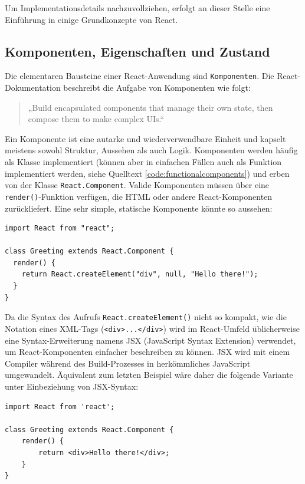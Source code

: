 Um Implementationsdetails nachzuvollziehen, erfolgt an dieser Stelle eine Einführung in einige Grundkonzepte von React.

\subsection{Komponenten, Eigenschaften und Zustand}
Die elementaren Bausteine einer React-Anwendung sind \texttt{Komponenten}. Die React-Dokumentation beschreibt die Aufgabe von Komponenten wie folgt\cite[Header-Sektion]{web:react}:
\begin{quote}
„Build encapsulated components that manage their own state, then compose them to make complex UIs.“
\end{quote}

Ein Komponente ist eine autarke und wiederverwendbare Einheit und kapselt meistens sowohl Struktur, Aussehen als auch Logik. Komponenten werden häufig als Klasse implementiert (können aber in einfachen Fällen auch als Funktion implementiert werden, siehe Quelltext \ref{code:functionalcomponents}) und erben von der Klasse \texttt{React.Component}. Valide Komponenten müssen über eine \texttt{render()}-Funktion verfügen, die HTML oder andere React-Komponenten zurückliefert. Eine sehr simple, statische Komponente könnte so aussehen:

\begin{minipage}{\linewidth}
\begin{lstlisting}[caption={Einfache React-Komponente ohne JSX-Syntax.}]
import React from "react";

class Greeting extends React.Component {
  render() {
    return React.createElement("div", null, "Hello there!");
  }
}
\end{lstlisting}
\end{minipage}

Da die Syntax des Aufrufs \texttt{React.createElement()} nicht so kompakt, wie die Notation eines XML-Tags (\texttt{<div>...</div>}) wird im React-Umfeld üblicherweise eine Syntax-Erweiterung namens JSX (JavaScript Syntax Extension) verwendet, um React-Komponenten einfacher beschreiben zu können. JSX wird mit einem Compiler während des Build-Prozesses in herkömmliches JavaScript umgewandelt. Äquivalent zum letzten Beispiel wäre daher die folgende Variante unter Einbeziehung von JSX-Syntax:

\begin{minipage}{\linewidth}
\begin{lstlisting}[caption={Einfache React-Komponente mit JSX-Syntax.}]
import React from 'react';

class Greeting extends React.Component {
    render() {
        return <div>Hello there!</div>;
    }
}
\end{lstlisting}
\end{minipage}

